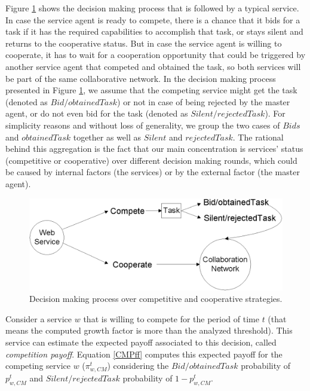 Figure \ref{decisionMakingProcedure} shows the decision making
process that is followed by a typical service. In case the service
agent is ready to compete, there is a chance that it bids for a
task if it has the required capabilities to accomplish that task,
or stays silent and returns to the cooperative status. But in case
the service agent is willing to cooperate, it has to wait for a
cooperation opportunity that could be triggered by another service
agent that competed and obtained the task, so both services will
be part of the same collaborative network. In the decision making
process presented in Figure \ref{decisionMakingProcedure}, we
assume that the competing service might get the task (denoted as
$Bid/obtainedTask$) or not in case of being rejected by the master
agent, or do not even bid for the task (denoted as
$Silent/rejectedTask$). For simplicity reasons and without loss of
generality, we group the two cases of $Bids$ and $obtainedTask$
together as well as $Silent$ and $rejectedTask$. The rational
behind this aggregation is the fact that our main concentration is
services' status (competitive or cooperative) over different
decision making rounds, which could be caused by internal factors
(the services) or by the external factor (the master agent).

\begin{figure}[h]
\centering
\includegraphics[scale=0.55]{Figures/decision1++.eps}
\caption{Decision making process over competitive and cooperative
strategies.} \label{decisionMakingProcedure}
\end{figure}




Consider a service $w$ that is willing to compete for the period
of time $t$ (that means the computed growth factor is more than
the analyzed threshold). This service can estimate the expected
payoff associated to this decision, called \emph{competition
payoff}. Equation \ref{CMPff} computes this expected payoff for
the competing service $w$ ($\pi_{w,CM}^t$) considering the
$Bid/obtainedTask$ probability of $p_{w,CM}^t$ and
$Silent/rejectedTask$ probability of $1-p_{w,CM}^t$.

